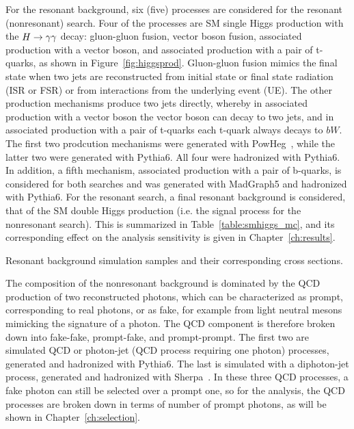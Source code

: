 For the resonant background, six (five) processes are considered for the resonant (nonresonant) search.
Four of the processes are SM single Higgs production with the $H\to\gamma\gamma$ decay: gluon-gluon fusion, vector
boson fusion, associated production with a vector boson, and associated production with a pair of
t-quarks, as shown in Figure~\ref{fig:higgsprod}. Gluon-gluon fusion mimics the final state when two
jets are reconstructed from initial state or final state radiation (ISR or FSR)
or from interactions from the underlying event (UE).
The other production mechanisms produce two jets directly,
whereby in associated production with a vector boson the vector boson can decay to two jets, and
in associated production with a pair of t-quarks each t-quark always decays to $bW$.
The first two prodcution mechanisms were generated with PowHeg~\cite{POWHEG_Frixione:2007vw},
while the latter two were generated with Pythia6.
All four were hadronized with Pythia6.
In addition, a fifth mechanism, associated production with a pair of b-quarks, is considered for
both searches and was generated with MadGraph5 and hadronized with Pythia6.
For the resonant search, a final resonant background is considered, that of the
SM double Higgs production (i.e. the signal process for the nonresonant search).
This is summarized in Table~\ref{table:smhiggs_mc}, and its corresponding effect on the analysis
sensitivity is given in Chapter~\ref{ch:results}.

\begin{table}[htbp!]
  \centering
  \renewcommand{\arraystretch}{1.4}
  \caption{Resonant background simulation samples and their corresponding cross sections.}
  
  \label{table:smhiggs_mc}
\end{table}

The composition of the nonresonant background is dominated by the QCD production of two
reconstructed photons, which can be characterized as prompt, corresponding to real photons,
or as fake, for example from light neutral mesons mimicking the signature of a photon. The QCD component
is therefore broken down into fake-fake, prompt-fake, and prompt-prompt. The first two are simulated
QCD or photon-jet (QCD process requiring one photon) processes, generated and hadronized with Pythia6.
The last is simulated with a diphoton-jet process, generated and hadronized
with Sherpa~\cite{Gleisberg:2008ta}. In these three QCD processes,
a fake photon can still be selected over a prompt one, so for the analysis, the QCD processes are
broken down in terms of number of prompt photons, as will be shown in Chapter~\ref{ch:selection}.

